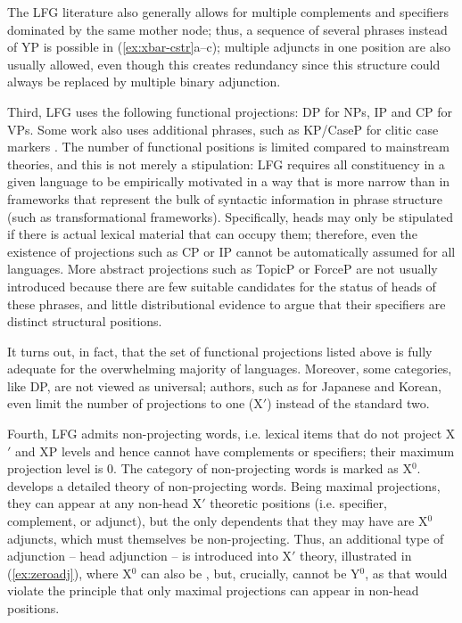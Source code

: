 \documentclass[output=paper,hidelinks]{langscibook}
\begin{document}
The LFG literature also generally allows for multiple complements and specifiers dominated by the same mother node; thus, a sequence of several phrases instead of YP is possible in (\ref{ex:xbar-cstr}a--c); multiple adjuncts in one position are also usually allowed, even though this creates redundancy since this structure could always be replaced by multiple binary adjunction.
 
 Third, LFG uses the following functional projections: DP for NPs, IP and CP for VPs. Some work also uses additional phrases, such as KP/CaseP for clitic case markers \parencite{broadwell2008}. The number of functional positions is limited compared to mainstream theories, and this is not merely a stipulation: LFG requires all constituency in a given language to be empirically motivated in a way that is more narrow than in frameworks that represent the bulk of syntactic information in phrase structure (such as transformational frameworks). Specifically, heads may only be stipulated if there is actual lexical material that can occupy them; therefore, even the existence of projections such as CP or IP cannot be automatically assumed for all languages. More abstract projections such as TopicP or ForceP are not usually introduced because there are few suitable candidates for the status of heads of these phrases, and little distributional evidence to argue that their specifiers are distinct structural positions.
 
 It turns out, in fact, that the set of functional projections listed above is fully adequate for the overwhelming majority of languages. Moreover, some categories, like DP, are not viewed as universal; %
 authors, such as \textcite{sells1994} for Japanese and Korean, even limit the number of projections to one (X$'$) instead of the standard two.
 
 Fourth, LFG admits non-projecting words, i.e. lexical items that do not project X$'$ and XP levels and hence cannot have complements or specifiers; their maximum projection level is 0. The category of non-projecting words is marked as X$^0$. \textcite{Toivonen:NonProj} develops a detailed theory of non-projecting words. Being maximal projections, they can appear at any non-head X$'$ theoretic positions (i.e. specifier, complement, or adjunct), but the only dependents that they may have are X$^0$ adjuncts, which must themselves be non-projecting. Thus, an additional type of adjunction -- head adjunction -- is introduced into X$'$ theory, illustrated in (\ref{ex:zeroadj}), where X$^0$ can also be , but, crucially,  cannot be Y$^0$, as that would violate the principle that only maximal projections can appear in non-head positions.
 
\end{document}
